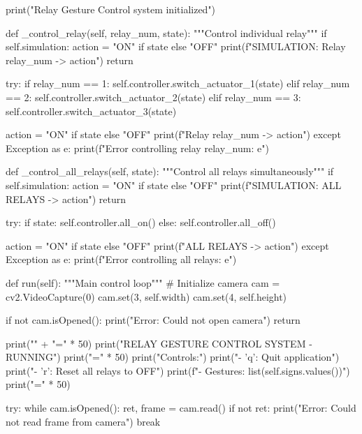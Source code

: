 \begin{aivncodebox}
\begin{python}
        print("Relay Gesture Control system initialized")
    
    def _control_relay(self, relay_num, state):
        """Control individual relay"""
        if self.simulation:
            action = "ON" if state else "OFF"
            print(f"SIMULATION: Relay {relay_num} -> {action}")
            return
        
        try:
            if relay_num == 1:
                self.controller.switch_actuator_1(state)
            elif relay_num == 2:
                self.controller.switch_actuator_2(state)
            elif relay_num == 3:
                self.controller.switch_actuator_3(state)
            
            action = "ON" if state else "OFF"
            print(f"Relay {relay_num} -> {action}")
        except Exception as e:
            print(f"Error controlling relay {relay_num}: {e}")
    
    def _control_all_relays(self, state):
        """Control all relays simultaneously"""
        if self.simulation:
            action = "ON" if state else "OFF"
            print(f"SIMULATION: ALL RELAYS -> {action}")
            return
        
        try:
            if state:
                self.controller.all_on()
            else:
                self.controller.all_off()
            
            action = "ON" if state else "OFF"
            print(f"ALL RELAYS -> {action}")
        except Exception as e:
            print(f"Error controlling all relays: {e}")
    
    def run(self):
        """Main control loop"""
        # Initialize camera
        cam = cv2.VideoCapture(0)
        cam.set(3, self.width)
        cam.set(4, self.height)
        
        if not cam.isOpened():
            print("Error: Could not open camera")
            return
        
        print("\n" + "=" * 50)
        print("RELAY GESTURE CONTROL SYSTEM - RUNNING")
        print("=" * 50)
        print("Controls:")
        print("- 'q': Quit application")
        print("- 'r': Reset all relays to OFF")
        print(f"- Gestures: {list(self.signs.values())}")
        print("=" * 50)
        
        try:
            while cam.isOpened():
                ret, frame = cam.read()
                if not ret:
                    print("Error: Could not read frame from camera")
                    break
                

\end{python}
\end{aivncodebox}
